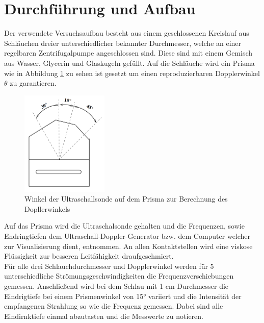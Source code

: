 \section{Durchführung und Aufbau}
\label{sec:Durchführung}
Der verwendete Versuchsaufbau besteht aus einem geschlossenen Kreislauf aus Schläuchen dreier unterschiedlicher bekannter Durchmesser, welche an einer regelbaren Zentrifugalpumpe angeschlossen sind. Diese sind mit einem Gemisch aus Wasser, Glycerin und Glaskugeln gefüllt.  Auf die Schläuche wird ein Prisma wie in Abbildung \ref{fig:Doppler} zu sehen ist gesetzt um einen reproduzierbaren Dopplerwinkel $\theta$ zu garantieren. 
\begin{figure}
  \centering
  \includegraphics[height=5cm]{picture/Winkel.png}
  \caption{Winkel der Ultraschallsonde auf dem Prisma zur Berechnung des Dopllerwinkels}
  \label{fig:Doppler}
\end{figure}
Auf das Prisma wird die Ultraschalsonde gehalten und die Frequenzen, sowie Endringtiefen dem Ultraschall-Doppler-Generator bzw. dem Computer welcher zur Visualisierung dient, entnommen. An allen Kontaktstellen wird eine viskose Flüssigkeit zur besseren Leitfähigkeit draufgeschmiert. 	\\
Für alle drei Schlauchdurchmesser und Dopplerwinkel werden für 5 unterschiedliche Strömungsgeschwindigkeiten die Frequenzverschiebungen gemessen. Anschließend wird bei dem Schlau mit 1 cm Durchmesser die Eindrigtiefe bei einem Prismenwinkel von 15° variiert und die Intensität der empfangenen Strahlung so wie die Frequenz gemessen. Dabei sind alle Eindirnktiefe einmal abzutasten und die Messwerte zu notieren. 
